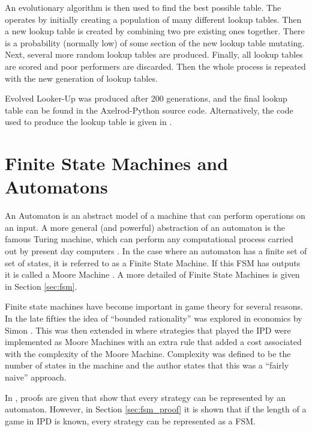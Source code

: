 An evolutionary algorithm is then used to find the best possible table.
The operates by initially creating a population of many different lookup tables.
Then a new lookup table is created by combining two pre existing ones together.
There is a probability (normally low) of some section of the new lookup table mutating.
Next, several more random lookup tables are produced.
Finally, all lookup tables are scored and poor performers are discarded.
Then the whole process is repeated with the new generation of lookup tables.

Evolved Looker-Up was produced after 200 generations, and the final lookup table can be found in the Axelrod-Python source code.
Alternatively, the code used to produce the lookup table is given in \cite{axelrod-evolver}.


\section{Finite State Machines and Automatons}
An Automaton is an abstract model of a machine that can perform operations on an input.
A more general (and powerful) abstraction of an automaton is the famous Turing machine, which can perform any computational process carried out by present day computers \cite{Turing1936, Kandar2013}.
In the case where an automaton has a finite set of set of states, it is referred to as a Finite State Machine.
If this FSM has outputs it is called a Moore Machine \cite{Ndjountche2016}.
A more detailed of Finite State Machines is given in Section \ref{sec:fsm}.

Finite state machines have become important in game theory for several reasons.
In the late fifties the idea of ``bounded rationality'' was explored in economics by Simon \cite{Simon1972}.
This was then extended in \cite{Rubinstein1986} where strategies that played the IPD were implemented as Moore Machines with an extra rule that added a cost associated with the complexity of the Moore Machine.
Complexity was defined to be the number of states in the machine and the author states that this was a ``fairly naive'' approach.

In \cite{Kalai1986, Kalai1988}, proofs are given that show that every strategy can be represented by an automaton.
However, in Section \ref{sec:fsm_proof} it is shown that if the length of a game in IPD is known, every strategy can be represented as a FSM.

